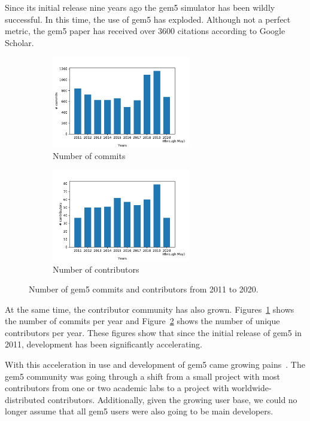 Since its initial release nine years ago the gem5 simulator has been wildly successful.
In this time, the use of gem5 has exploded.
Although not a perfect metric, the gem5 paper has received over 3600 citations according to Google Scholar.

\begin{figure}
    \centering
    \begin{subfigure}{0.4\linewidth}
      \centering
      \includegraphics[height=4cm]{fig/gem5_commits}
      \caption{Number of commits}
      \label{fig:commits}
    \end{subfigure}
    \begin{subfigure}{0.4\linewidth}
      \centering
      \includegraphics[height=4cm]{fig/gem5_contributors}
      \caption{Number of contributors}
      \label{fig:contributors}
    \end{subfigure}
    \caption{Number of gem5 commits and contributors from 2011 to 2020.}
    \label{fig:gem5_commits_contributors}
\end{figure}

At the same time, the contributor community has also grown.
Figures~\ref{fig:commits} shows the number of commits per year and Figure~\ref{fig:contributors} shows the number of unique contributors per year.
These figures show that since the initial release of gem5 in 2011, development has been significantly accelerating.

With this acceleration in use and development of gem5 came growing pains~\cite{Power-gem5horrors-2015}.
The gem5 community was going through a shift from a small project with most contributors from one or two academic labs to a project with worldwide-distributed contributors.
Additionally, given the growing user base, we could no longer assume that all gem5 users were also going to be main developers.

